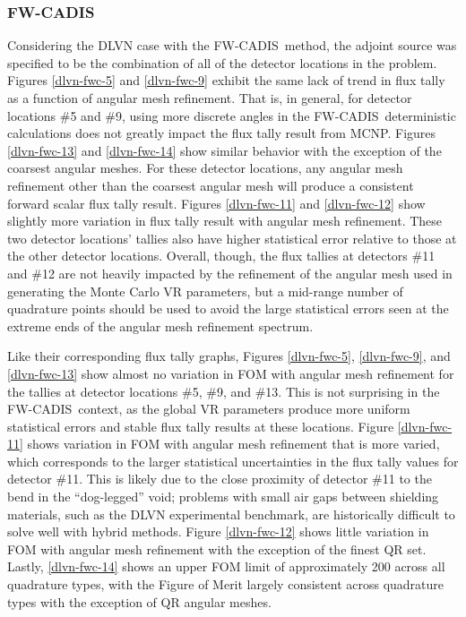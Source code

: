 \documentclass{article} %
\newcommand{\fwc}{\mbox{FW-CADIS}}
\begin{document}
\FloatBarrier
\subsubsection{\fwc}

Considering the DLVN case with the \fwc\ method, the adjoint source was
specified to be the combination of all of the detector locations in the
problem. Figures \ref{dlvn-fwc-5} and \ref{dlvn-fwc-9} exhibit the same lack of trend in
flux tally as a function of angular mesh refinement. That is, in general, for
detector locations \#5 and \#9, using more discrete angles in the \fwc\
deterministic calculations does not greatly impact the flux tally result from
MCNP. Figures \ref{dlvn-fwc-13} and \ref{dlvn-fwc-14} show similar behavior
with the exception of the coarsest angular meshes. For these detector
locations, any angular mesh refinement other than the coarsest angular mesh
will produce a consistent forward scalar flux tally result. Figures
\ref{dlvn-fwc-11} and \ref{dlvn-fwc-12} show slightly more variation in flux
tally result with angular mesh refinement. These two detector locations'
tallies also have higher statistical error relative to those at the other
detector locations. Overall, though, the flux tallies at detectors \#11 and
\#12 are not heavily impacted by the refinement of the angular mesh used in
generating the Monte Carlo VR parameters, but a mid-range number of
quadrature points should be used to avoid the large statistical errors seen at
the extreme ends of the angular mesh refinement spectrum.

Like their corresponding flux tally graphs, Figures \ref{dlvn-fwc-5},
\ref{dlvn-fwc-9}, and \ref{dlvn-fwc-13} show almost no variation in FOM with
angular mesh refinement for the tallies at detector locations \#5, \#9, and
\#13. This is not surprising in the \fwc\ context, as the global VR parameters
produce more uniform statistical errors and
stable flux tally results at these locations. Figure \ref{dlvn-fwc-11} shows
variation in FOM with angular mesh refinement that is more varied, which
corresponds to the larger statistical uncertainties in the flux tally values
for detector \#11. This is likely due to the close proximity of detector \#11
to the bend in the ``dog-legged'' void; problems with small air gaps between
shielding materials, such as the DLVN experimental benchmark, are historically
difficult to solve well with hybrid methods.
Figure \ref{dlvn-fwc-12} shows little variation in FOM with
angular mesh refinement with the exception of the finest QR set. Lastly,
\ref{dlvn-fwc-14} shows an upper FOM limit of approximately 200 across all
quadrature types, with the Figure of Merit largely consistent across
quadrature types with the exception of QR angular meshes.
\end{document}
